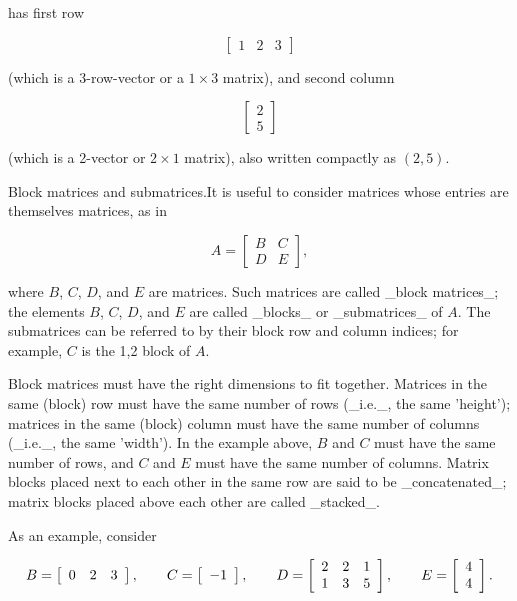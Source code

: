 has first row

\[\left[\begin{array}{ccc}1&2&3\end{array}\right]\]

(which is a 3-row-vector or a \(1\times 3\) matrix), and second column

\[\left[\begin{array}{c}2\\ 5\end{array}\right]\]

(which is a 2-vector or \(2\times 1\) matrix), also written compactly as \((2,5)\).

Block matrices and submatrices.It is useful to consider matrices whose entries are themselves matrices, as in

\[A=\left[\begin{array}{cc}B&C\\ D&E\end{array}\right],\]

where \(B\), \(C\), \(D\), and \(E\) are matrices. Such matrices are called _block matrices_; the elements \(B\), \(C\), \(D\), and \(E\) are called _blocks_ or _submatrices_ of \(A\). The submatrices can be referred to by their block row and column indices; for example, \(C\) is the 1,2 block of \(A\).

Block matrices must have the right dimensions to fit together. Matrices in the same (block) row must have the same number of rows (_i.e._, the same 'height'); matrices in the same (block) column must have the same number of columns (_i.e._, the same 'width'). In the example above, \(B\) and \(C\) must have the same number of rows, and \(C\) and \(E\) must have the same number of columns. Matrix blocks placed next to each other in the same row are said to be _concatenated_; matrix blocks placed above each other are called _stacked_.

As an example, consider

\[B=\left[\begin{array}{ccc}0&2&3\end{array}\right],\qquad C=\left[\begin{array} []{ccc}-1\end{array}\right],\qquad D=\left[\begin{array}{ccc}2&2&1\\ 1&3&5\end{array}\right],\qquad E=\left[\begin{array}{c}4\\ 4\end{array}\right].\]

